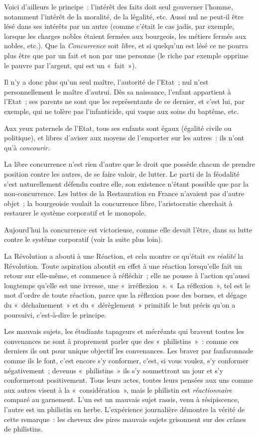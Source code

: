 \documentclass[french,twoside]{book} %
\begin{document}
Voici d’ailleurs le principe : l’intérêt des faits doit seul gouverner l’homme, notamment l’intérêt de la moralité, de la légalité, etc. Aussi nul ne peut-il être lésé dans ses intérêts par un autre (comme c’était le cas jadis, par exemple, lorsque les charges nobles étaient fermées aux bourgeois, les métiers fermés aux nobles, etc.). Que la \emph{Concurrence} soit \emph{libre}, et si quelqu’un est lésé ce ne pourra plus être que par un fait et non par une personne (le riche par exemple opprime le pauvre par l’argent, qui est un « fait »).\par
Il n’y a donc plus qu’un seul maître, l’autorité de l’Etat ; nul n’est personnellement le maître d’autrui. Dès sa naissance, l’enfant appartient à l’Etat ; ses parents ne sont que les représentants de ce dernier, et c’est lui, par exemple, qui ne tolère pas l’infanticide, qui vaque aux soins du baptême, etc.\par
Aux yeux paternels de l’Etat, tous ses enfants sont égaux (égalité civile ou politique), et libres d’aviser  aux moyens de l’emporter sur les autres : ils n’ont qu’à \emph{concourir.}\par
La libre concurrence n’est rien d’autre que le droit que possède chacun de prendre position contre les autres, de se faire valoir, de lutter. Le parti de la féodalité s’est naturellement défendu contre elle, son existence n’étant possible que par la non-concurrence. Les luttes de la Restauration en France n’avaient pas d’autre objet ; la bourgeoisie voulait la concurrence libre, l’aristocratie cherchait à restaurer le système corporatif et le monopole.\par
Aujourd’hui la concurrence est victorieuse, comme elle devait l’être, dans sa lutte contre le système corporatif (voir la suite plus loin).\par
La Révolution a abouti à une Réaction, et cela montre ce qu’était \emph{en réalité} la Révolution. Toute aspiration aboutit en effet à une réaction lorsqu’elle fait un retour sur elle-même, et commence à réfléchir ; elle ne pousse à l’action qu’aussi longtemps qu’elle est une ivresse, une « irréflexion ». « La réflexion », tel est le mot d’ordre de toute réaction, parce que la réflexion pose des bornes, et dégage du « déchaînement » et du « dérèglement » primitifs le but précis qu’on a poursuivi, c’est-à-dire le principe.\par
Les mauvais sujets, les étudiants tapageurs et mécréants qui bravent toutes les convenances ne sont à proprement parler que des « philistins » : comme ces derniers ils ont pour unique objectif les convenances. Les braver par fanfaronnade comme ils le font, c’est encore s’y conformer, c’est, si vous voulez, s’y conformer négativement ; devenus « philistins » ils s’y soumettront un jour et s’y conformeront positivement. Tous leurs actes, toutes leurs pensées aux uns comme aux autres visent à la « considération », mais le philistin est \emph{réactionnaire} comparé au garnement. L’un est un mauvais sujet rassis, venu à résipiscence, l’autre est un philistin en herbe. L’expérience journalière démontre  la vérité de cette remarque : les cheveux des pires mauvais sujets grisonnent sur des crânes de philistins.\par
\end{document}
